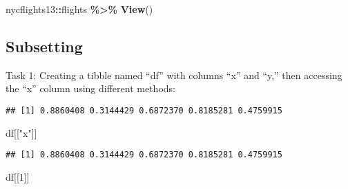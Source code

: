 \documentclass[
]{article}
\newenvironment{Shaded}{\begin{snugshade}}{\end{snugshade}}
\newcommand{\AttributeTok}[1]{\textcolor[rgb]{0.13,0.29,0.53}{#1}}
\newcommand{\CommentTok}[1]{\textcolor[rgb]{0.56,0.35,0.01}{\textit{#1}}}
\newcommand{\DecValTok}[1]{\textcolor[rgb]{0.00,0.00,0.81}{#1}}
\newcommand{\FunctionTok}[1]{\textcolor[rgb]{0.13,0.29,0.53}{\textbf{#1}}}
\newcommand{\NormalTok}[1]{#1}
\newcommand{\OtherTok}[1]{\textcolor[rgb]{0.56,0.35,0.01}{#1}}
\newcommand{\SpecialCharTok}[1]{\textcolor[rgb]{0.81,0.36,0.00}{\textbf{#1}}}
\newcommand{\StringTok}[1]{\textcolor[rgb]{0.31,0.60,0.02}{#1}}
\begin{document}
\begin{Shaded}
\begin{Highlighting}[]
\NormalTok{nycflights13}\SpecialCharTok{::}\NormalTok{flights }\SpecialCharTok{\%\textgreater{}\%} 
  \FunctionTok{View}\NormalTok{()}
\end{Highlighting}
\end{Shaded}

\hypertarget{subsetting}{%
\subsection{Subsetting}\label{subsetting}}

Task 1: Creating a tibble named ``df'' with columns ``x'' and ``y,''
then accessing the ``x'' column using different methods:

\begin{Shaded}
\end{Shaded}

\begin{verbatim}
## [1] 0.8860408 0.3144429 0.6872370 0.8185281 0.4759915
\end{verbatim}

\begin{Shaded}
\begin{Highlighting}[]
\NormalTok{df[[}\StringTok{"x"}\NormalTok{]]}
\end{Highlighting}
\end{Shaded}

\begin{verbatim}
## [1] 0.8860408 0.3144429 0.6872370 0.8185281 0.4759915
\end{verbatim}

\begin{Shaded}
\begin{Highlighting}[]
\NormalTok{df[[}\DecValTok{1}\NormalTok{]]}
\end{Highlighting}
\end{Shaded}
\end{document}
